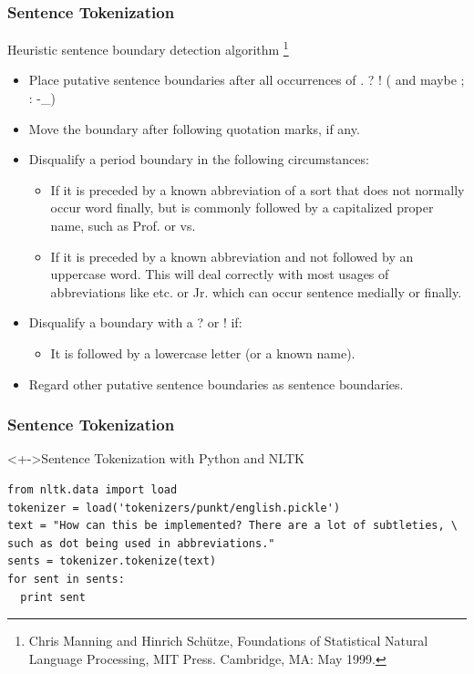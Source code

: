 \documentclass[serif,11pt,aspectratio=1610,table]{beamer}
\begin{document}
\begin{frame}[fragile]
 \frametitle{Sentence Tokenization}
\footnotesize
Heuristic sentence boundary detection algorithm \footnote{Chris Manning and Hinrich Schütze, Foundations of Statistical Natural Language Processing, MIT Press. Cambridge, MA: May 1999. }

\footnotesize
\begin{itemize}
 \item Place putative sentence boundaries after all occurrences of  . ? ! ( and maybe ; : -\_)
 \item Move the boundary after following quotation marks, if any.
 \item Disqualify a period boundary in the following circumstances:
    \begin{itemize}
     \item If it is preceded by a known abbreviation of a sort that does not normally occur word finally, but is commonly followed by a capitalized proper name, such as Prof. or vs.
     \item If it is preceded by a known abbreviation and not followed by an uppercase word. This will deal correctly with most usages of abbreviations like etc. or Jr. which can occur sentence medially or finally.
    \end{itemize}
 \item Disqualify a boundary with a ? or ! if:
  \begin{itemize}
   \item It is followed by a lowercase letter (or a known name).
  \end{itemize}
 \item Regard other putative sentence boundaries as sentence boundaries.
\end{itemize}
\end{frame}

\begin{frame}[fragile]
 \frametitle{Sentence Tokenization}

\begin{block}<+->{Sentence Tokenization with Python and NLTK}
\footnotesize
\begin{verbatim}
from nltk.data import load
tokenizer = load('tokenizers/punkt/english.pickle')
text = "How can this be implemented? There are a lot of subtleties, \
such as dot being used in abbreviations."
sents = tokenizer.tokenize(text)
for sent in sents:
  print sent

\end{verbatim}

\end{block}

\end{frame}
\end{document}
